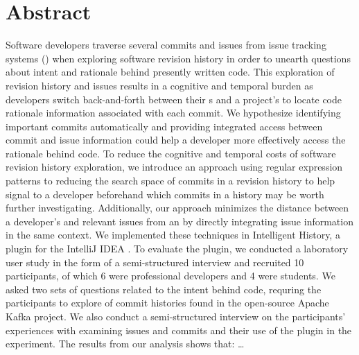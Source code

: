 
\chapter{Abstract}


Software developers traverse several commits and issues from issue tracking systems ()
when exploring software revision history in order to unearth questions about intent and rationale behind presently written code.
This exploration of revision history and issues results in a cognitive and temporal burden as developers
switch back-and-forth between their s and a project's  to locate code rationale information
associated with each commit.
We hypothesize identifying important commits automatically and providing integrated access between commit and issue information could help a developer more effectively access the rationale behind code.
To reduce the cognitive and temporal costs of software revision history exploration,
we introduce an approach using regular expression patterns to reducing the search space of commits in a revision history to help
signal to a developer beforehand which commits in a history may be worth further investigating.
Additionally, our approach minimizes the distance between a developer's  and relevant issues from an 
by directly integrating issue information in the same context.
We implemented these techniques in Intelligent History, a plugin for the IntelliJ IDEA .
To evaluate the plugin, we conducted a laboratory user study in the form of a semi-structured interview and 
recruited 10 participants, of which 6 were professional developers and 4 were students.
We asked two sets of questions related to the intent behind code, requring the participants to explore of 
commit histories found in the open-source Apache Kafka project.
We also conduct a semi-structured interview on the participants' experiences with examining issues and commits 
and their use of the plugin in the experiment.
The results from our analysis shows that: \dots

\vfill
\begin{center}
\begin{sf}
\end{sf}
\end{center}

